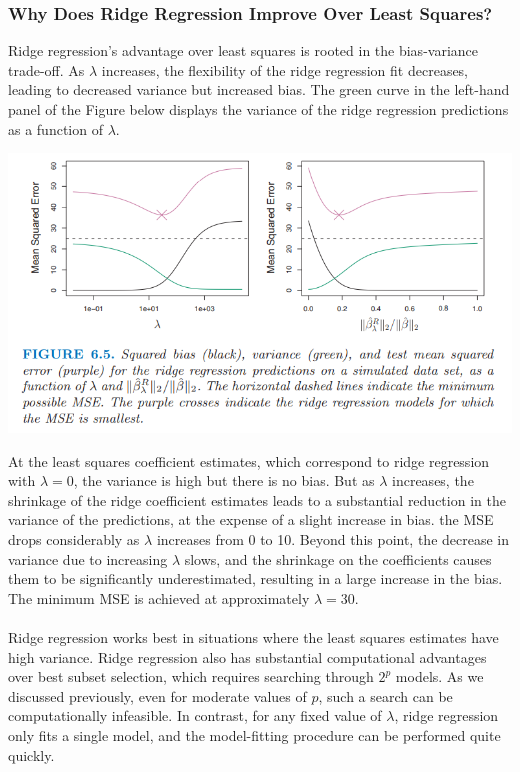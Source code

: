 \subsubsection{Why Does Ridge Regression Improve Over Least Squares?}
Ridge regression’s advantage over least squares is rooted in the bias-variance trade-off. As $\lambda$ increases, the flexibility of the ridge regression fit decreases, leading to decreased variance but increased bias. The green curve in the left-hand panel of the Figure below displays the variance of the ridge regression predictions as a function of $\lambda$.
\begin{center}
    \includegraphics[scale=0.6]{images/ridge-reg-bias-variance.png}
\end{center}
At the least squares coefficient estimates, which correspond
to ridge regression with $\lambda = 0$, the variance is high but there is no bias. But as $\lambda$ increases, the shrinkage of the ridge coefficient estimates leads to a substantial reduction in the variance of the predictions, at the expense of a slight increase in bias. the MSE drops considerably as $\lambda$ increases from 0 to 10. Beyond this point, the decrease in variance due to increasing $\lambda$ slows, and the shrinkage on the coefficients causes them to be significantly underestimated, resulting in a large increase in the bias. The minimum MSE is achieved at approximately $\lambda = 30$.\\\\
Ridge regression works best in situations where the least squares estimates have high variance. Ridge regression also has substantial computational advantages over best subset selection, which requires searching through $2^p$ models. As we discussed previously, even for moderate values of $p$, such a search can be computationally infeasible. In contrast, for any fixed value of $\lambda$, ridge regression only fits a single model, and the model-fitting procedure can be performed quite quickly.

